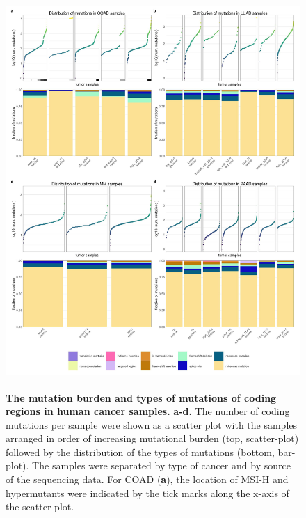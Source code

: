 \documentclass[english, 12pt, letterpaper]{article}
\begin{document}
\begin{figure}[p]
\centering
\includegraphics[height=150mm]{figures/SuppFigure_04.jpeg}
\caption{
    \textbf{The mutation burden and types of mutations of coding regions in human cancer samples.}
    \textbf{a-d.} The number of coding mutations per sample were shown as a scatter plot with the samples arranged in order of increasing mutational burden (top, scatter-plot) followed by the distribution of the types of mutations (bottom, bar-plot). The samples were separated by type of cancer and by source of the sequencing data.
    For COAD (\textbf{a}), the location of MSI-H and hypermutants were indicated by the tick marks along the x-axis of the scatter plot.
}
\label{sfig:mutation-burden-of-cancer-samples}
\end{figure}
\end{document}
